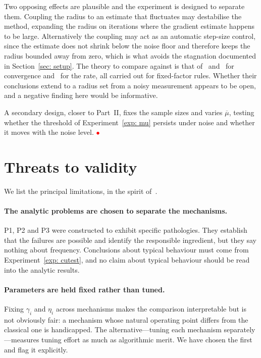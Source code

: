 \documentclass[11pt]{article}
\theoremstyle{plain}
\theoremstyle{definition}
\theoremstyle{remark}
\numberwithin{equation}{section}
\newcommand{\placeholder}{\textcolor{red}{$\bullet$}}
\begin{document}
Two opposing effects are plausible and the experiment is designed to separate them. Coupling the
radius to an estimate that fluctuates may destabilise the method, expanding the radius on
iterations where the gradient estimate happens to be large. Alternatively the coupling may act as
an automatic step-size control, since the estimate does not shrink below the noise floor and
therefore keeps the radius bounded away from zero, which is what avoids the stagnation documented
in Section~\ref{sec: setup}. The theory to compare against is
that of~\citet{BandeiraScheinbergVicente14} and~\citet{ChenMenickellyScheinberg18} for
convergence and~\citet{BlanchetCartisMenickellyScheinberg19} for the rate, all carried out for
fixed-factor rules. Whether their conclusions extend to a radius set from a noisy measurement
appears to be open, and a negative finding here would be informative.

A secondary design, closer to Part~II, fixes the sample sizes and varies $\overline{\mu}$, testing
whether the threshold of Experiment~\ref{exp: mu} persists under noise and whether it moves with
the noise level. \placeholder

\section{Threats to validity}
\label{sec: threats}

We list the principal limitations, in the spirit of~\citet{BeiranvandHareLucet17}.

\paragraph{The analytic problems are chosen to separate the mechanisms.}
P1, P2 and P3 were constructed to exhibit specific pathologies. They establish that the failures
are possible and identify the responsible ingredient, but they say nothing about frequency.
Conclusions about typical behaviour must come from Experiment~\ref{exp: cutest}, and no claim
about typical behaviour should be read into the analytic results.

\paragraph{Parameters are held fixed rather than tuned.}
Fixing $\gamma_i$ and $\eta_i$ across mechanisms makes the comparison interpretable but is not
obviously fair: a mechanism whose natural operating point differs from the classical one is
handicapped. The alternative---tuning each mechanism separately---measures tuning effort as
much as algorithmic merit. We have chosen the first and flag it explicitly.
\end{document}
